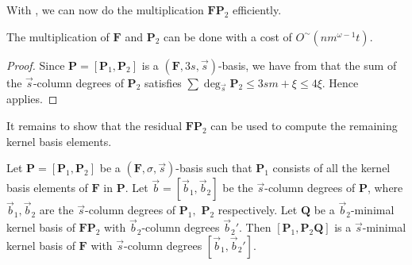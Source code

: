 \begin{thm}
\begin{comment}
Next we multiply $\mathbf{A}$ with $\mathbf{B}^{(2)}$. We proceed
in the same way as before, but notice that $\mathbf{A}_{1}\mathbf{B}_{1}^{(2)}$
is no longer needed since $\mathbf{B}_{1}^{(2)}=0$. Multiplying $\mathbf{A}$
and $\mathbf{B}^{(2)}$ also costs $O^{\sim}\left(nm^{\omega-2}\xi\right)$.

Continue doing this, it costs $O^{\sim}\left(nm^{\omega-2}\xi\right)$.
to multiply $\mathbf{A}$ with the columns $\mathbf{B}^{(i)}$ for
$i$ from $1$ to $\log m$. As before, remember that $\mathbf{B}_{(j)}^{(i)}=0$
for $j>i$. The overall cost for $i$ from 1 to $\log m$ is $O^{\sim}\left(nm^{\omega-2}\xi\right)$
to multiply $\mathbf{A}$ and $\mathbf{B}$. \end{proof}
\end{comment}

\end{thm}
With , we can now do the
multiplication $\mathbf{F}\mathbf{P}_{2}$ efficiently. 
\begin{cor}
\label{cor:multiplyingFP2}The multiplication of $\mathbf{F}$ and
$\mathbf{P}_{2}$ can be done with a cost of $O^{\sim}(nm^{\omega-1}t)$.\end{cor}
\begin{proof}
Since $\mathbf{P}=[\mathbf{P}_{1},\mathbf{P}_{2}]$ is a $(\mathbf{F},3s,\vec{s})$-basis,
we have from 
that the sum of the $\vec{s}$-column degrees of $\mathbf{P}_{2}$
satisfies $\sum\deg_{\vec{s}}\mathbf{P}_{2}\le3sm+\xi\leq4\xi$. Hence
 applies. 
\end{proof}
It remains to show that the residual $\mathbf{F}\mathbf{P}_{2}$ can
be used to compute the remaining kernel basis elements. 
\begin{thm}
\label{thm:continueComputingNullspaceBasisByColumns}Let $\mathbf{P}=\left[\mathbf{P}_{1},\mathbf{P}_{2}\right]$
be a $\left(\mathbf{F},\sigma,\vec{s}\right)$-basis such that $\mathbf{P}_{1}$
consists of all the kernel basis elements of $\mathbf{F}$ in $\mathbf{P}$.
Let $\vec{b}=[\vec{b}_{1},\vec{b}_{2}]$ be the $\vec{s}$-column
degrees of $\mathbf{P}$, where $\vec{b}_{1},\vec{b}_{2}$ are the
$\vec{s}$-column degrees of $\mathbf{P}_{1},$ $\mathbf{P}_{2}$
respectively. Let $\mathbf{Q}$ be a $\vec{b}_{2}$-minimal kernel
basis of $\mathbf{F}\mathbf{P}_{2}$ with $\vec{b}_{2}$-column degrees
$\vec{b}_{2}'$. Then $\left[\mathbf{P}_{1},\mathbf{P}_{2}\mathbf{Q}\right]$
is a $\vec{s}$-minimal kernel basis of $\mathbf{F}$ with $\vec{s}$-column
degrees $[\vec{b}_{1},\vec{b}_{2}']$.\end{thm}
